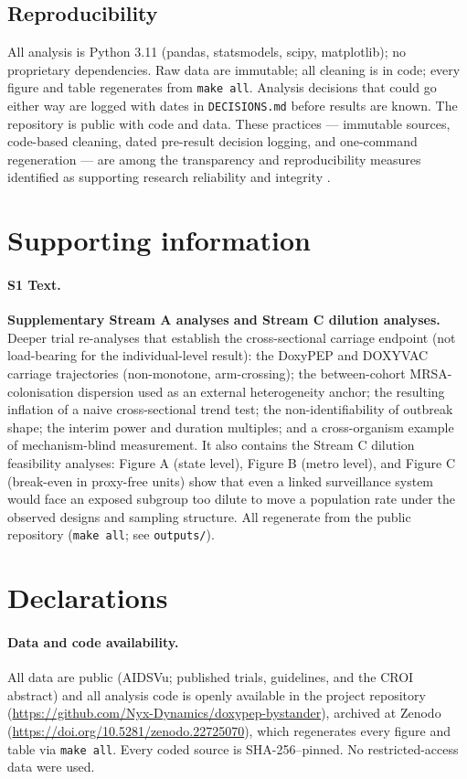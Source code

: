 \documentclass[10pt,letterpaper]{article}
\begin{document}
\subsection*{Reproducibility}

All analysis is Python 3.11 (pandas, statsmodels, scipy, matplotlib); no
proprietary dependencies. Raw data are immutable; all cleaning is in
code; every figure and table regenerates from \texttt{make\ all}.
Analysis decisions that could go either way are logged with dates in
\texttt{DECISIONS.md} before results are known. The repository is public with code and data. These practices --- immutable sources, code-based cleaning, dated pre-result decision logging, and one-command regeneration --- are among the transparency and reproducibility measures identified as supporting research reliability and integrity \cite{armond2024integrity}.


\section*{Supporting information}

\paragraph*{S1 Text.}
\label{S1_Text}
{\bf Supplementary Stream A analyses and Stream C dilution analyses.} Deeper trial re-analyses that
establish the cross-sectional carriage endpoint (not load-bearing for the individual-level result):
the DoxyPEP and DOXYVAC carriage trajectories (non-monotone, arm-crossing); the between-cohort
MRSA-colonisation dispersion used as an external heterogeneity anchor; the resulting inflation of a
naive cross-sectional trend test; the non-identifiability of outbreak shape; the interim power and
duration multiples; and a cross-organism example of mechanism-blind measurement. It also contains the
Stream C dilution feasibility analyses: Figure A (state level), Figure B (metro level), and Figure C
(break-even in proxy-free units) show that even a linked surveillance system would face an exposed
subgroup too dilute to move a population rate under the observed designs and sampling structure. All
regenerate from the public repository (\texttt{make all}; see \texttt{outputs/}).

\section*{Declarations}

\paragraph*{Data and code availability.} All data are public (AIDSVu; published trials, guidelines,
and the CROI abstract) and all analysis code is openly available in the project repository
(\url{https://github.com/Nyx-Dynamics/doxypep-bystander}), archived at Zenodo
(\url{https://doi.org/10.5281/zenodo.22725070}), which regenerates every figure and table via
\texttt{make all}. Every coded source is SHA-256--pinned. No restricted-access data were used.
\end{document}
